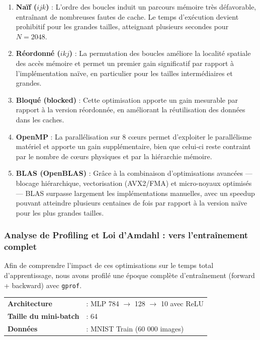 \documentclass[a4paper,11pt]{article}
\begin{document}
\begin{enumerate}
    \item \textbf{Naïf ($ijk$)} : L'ordre des boucles induit un parcours mémoire très défavorable, entraînant de nombreuses fautes de cache. Le temps d'exécution devient prohibitif pour les grandes tailles, atteignant plusieurs secondes pour $N=2048$.
    
    \item \textbf{Réordonné ($ikj$)} : La permutation des boucles améliore la localité spatiale des accès mémoire et permet un premier gain significatif par rapport à l'implémentation naïve, en particulier pour les tailles intermédiaires et grandes.
    
    \item \textbf{Bloqué (blocked)} : Cette optimisation apporte un gain mesurable par rapport à la version réordonnée, en améliorant la réutilisation des données dans les caches.
    
    \item \textbf{OpenMP} : La parallélisation sur 8 cœurs permet d'exploiter le parallélisme matériel et apporte un gain supplémentaire, bien que celui-ci reste contraint par le nombre de cœurs physiques et par la hiérarchie mémoire.
    
    \item \textbf{BLAS (OpenBLAS)} : Grâce à la combinaison d'optimisations avancées — blocage hiérarchique, vectorisation (AVX2/FMA) et micro-noyaux optimisés — BLAS surpasse largement les implémentations manuelles, avec un speedup pouvant atteindre plusieurs centaines de fois par rapport à la version naïve pour les plus grandes tailles.
\end{enumerate}

\subsubsection{Analyse de Profiling et Loi d'Amdahl : vers l'entraînement complet}

Afin de comprendre l'impact de ces optimisations sur le temps total d'apprentissage, nous avons profilé une époque complète d'entraînement (forward + backward) avec \texttt{gprof}.

\begin{tabular}{@{}ll@{}}
\textbf{Architecture} & : MLP 784 $\to$ 128 $\to$ 10 avec ReLU \\
\textbf{Taille du mini-batch} & : 64 \\
\textbf{Données}      & : MNIST Train (60 000 images)
\end{tabular}
\end{document}
